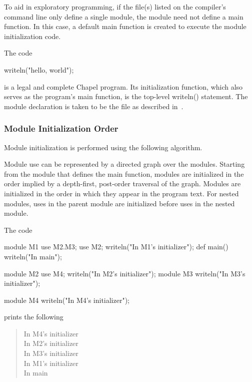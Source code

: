 
To aid in exploratory programming, if the file(s) listed on the
compiler's command line only define a single module, the module need
not define a main function.  In this case, a default main function is
created to execute the module initialization code.
\begin{example}
The code
\begin{chapel}
writeln("hello, world");
\end{chapel}
is a legal and complete Chapel program.  Its initialization function,
which also serves as the program's main function, is the top-level
writeln() statement.  The module declaration is taken to be the file
as described in~.
\end{example}


\subsubsection{Module Initialization Order}
\label{Module_Initialization_Order}

Module initialization is performed using the following algorithm.

Module use can be represented by a directed graph over the modules.
Starting from the module that defines the main function, modules are
initialized in the order implied by a depth-first, post-order
traversal of the graph.  Modules are initialized in the order in which
they appear in the program text.  For nested modules, uses in the
parent module are initialized before uses in the nested module.

\begin{example}
The code
\begin{chapelcode}
module M1 {
  use M2.M3;
  use M2;
  writeln("In M1's initializer");
  def main() {
    writeln("In main");
  }
}

module M2 {
  use M4;
  writeln("In M2's initializer");
  module M3 {
    writeln("In M3's initializer");
  }
}

module M4 {
  writeln("In M4's initializer");
}
\end{chapelcode}
prints the following
\begin{quote}
In M4's initializer\\
In M2's initializer\\
In M3's initializer\\
In M1's initializer\\
In main
\end{quote}
\end{example}
